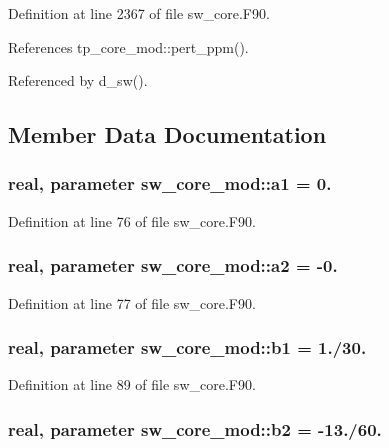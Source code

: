Definition at line 2367 of file sw\-\_\-core.\-F90.



References tp\-\_\-core\-\_\-mod\-::pert\-\_\-ppm().



Referenced by d\-\_\-sw().



\subsection{Member Data Documentation}
\subsubsection[{a1}]{\setlength{\rightskip}{0pt plus 5cm}real, parameter sw\-\_\-core\-\_\-mod\-::a1 = 0.}\label{classsw__core__mod_aa12b598cb86848b3e2adb065b564997e}


Definition at line 76 of file sw\-\_\-core.\-F90.

\subsubsection[{a2}]{\setlength{\rightskip}{0pt plus 5cm}real, parameter sw\-\_\-core\-\_\-mod\-::a2 = -\/0.}\label{classsw__core__mod_a29d1577650c0131c79a4d8f34d317b87}


Definition at line 77 of file sw\-\_\-core.\-F90.

\subsubsection[{b1}]{\setlength{\rightskip}{0pt plus 5cm}real, parameter sw\-\_\-core\-\_\-mod\-::b1 = 1./30.}\label{classsw__core__mod_a232f80cdeba816990b2606c04b5468a6}


Definition at line 89 of file sw\-\_\-core.\-F90.

\subsubsection[{b2}]{\setlength{\rightskip}{0pt plus 5cm}real, parameter sw\-\_\-core\-\_\-mod\-::b2 = -\/13./60.}\label{classsw__core__mod_ae0c21e56d1941db4d7f16af5f24720c5}


